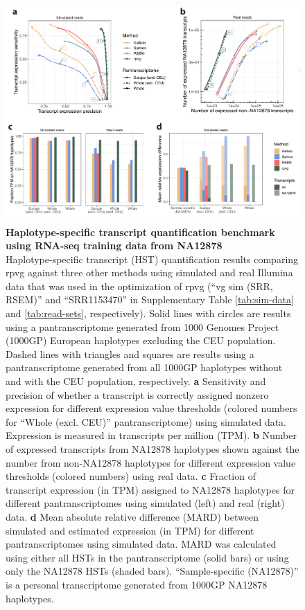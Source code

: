 \documentclass[11pt]{ucthesis}
\begin{document}
\begin{figure}[H]
\ssp
\begin{center}
\includegraphics[width=\textwidth]{mpmapfigures/figureS9.pdf}
\caption{\textbf{Haplotype-specific transcript quantification benchmark using RNA-seq training data from NA12878} \\
Haplotype-specific transcript (HST) quantification results comparing rpvg against three other methods using simulated and real Illumina data that was used in the optimization of rpvg (``vg sim (SRR, RSEM)'' and ``SRR1153470'' in Supplementary Table \ref{tab:sim-data} and \ref{tab:read-sets}, respectively). Solid lines with circles are results using a pantranscriptome generated from 1000 Genomes Project (1000GP) European haplotypes excluding the CEU population. Dashed lines with triangles and squares are results using a pantranscriptome generated from all 1000GP haplotypes without and with the CEU population, respectively. \textbf{a} Sensitivity and precision of whether a transcript is correctly assigned nonzero expression for different expression value thresholds (colored numbers for ``Whole (excl. CEU)'' pantranscriptome) using simulated data. Expression is measured in transcripts per million (TPM). \textbf{b} Number of expressed transcripts from NA12878 haplotypes shown against the number from non-NA12878 haplotypes for different expression value thresholds (colored numbers) using real data. \textbf{c} Fraction of transcript expression (in TPM) assigned to NA12878 haplotypes for different pantranscriptomes using simulated (left) and real (right) data. \textbf{d} Mean absolute relative difference (MARD) between simulated and estimated expression (in TPM) for different pantranscriptomes using simulated data. MARD was calculated using either all HSTs in the pantranscriptome (solid bars) or using only the NA12878 HSTs (shaded bars). ``Sample-specific (NA12878)'' is a personal transcriptome generated from 1000GP NA12878 haplotypes.
} \label{fig:expression-srr}
\end{center}
\end{figure}
 
\end{document}
